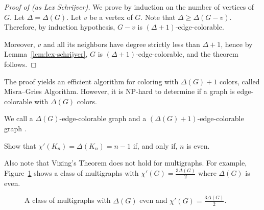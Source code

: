 \begin{proof}[Proof of  (as Lex Schrijver)]
    We prove by induction on the number of vertices of \(G\).
    Let \(\Delta = \Delta(G)\).
    Let \(v\) be a vertex of \(G\).
    Note that \(\Delta \geq \Delta(G - v)\).
    Therefore, by induction hypothesis,
    \(G - v\) is \((\Delta + 1)\)-edge-colorable.

    Moreover, \(v\) and all its neighbors have degree strictly less than \(\Delta + 1\), hence by Lemma~\ref{lem:lex-schrijver},
    \(G\) is \((\Delta + 1)\)-edge-colorable, and the theorem follows.
\end{proof}

The proof yields an efficient algorithm for coloring with \(\Delta(G) + 1\) colors,
called Misra--Gries Algorithm.
However, it is NP-hard to determine if a graph is edge-colorable with \(\Delta(G)\) colors.

We call a \(\Delta(G)\)-edge-colorable graph  and a \((\Delta(G) + 1)\)-edge-colorable graph .

\begin{exercise}
    Show that \(\chi'(K_n) = \Delta(K_n) = n-1\) if, and only if, \(n\) is even.
\end{exercise}

Also note that Vizing's Theorem does not hold for multigraphs.
For example, Figure~\ref{fig:vizing-multigraph-counterexample}
shows a class of multigraphs with \(\chi'(G) = \frac{3\Delta(G)}{2}\) where \(\Delta(G)\) is even.

\begin{figure}[htbp]
    \centering
    \caption{A class of multigraphs with \(\Delta(G)\) even and \(\chi'(G) = \frac{3\Delta(G)}{2}\).}
    \label{fig:vizing-multigraph-counterexample}
\end{figure}

